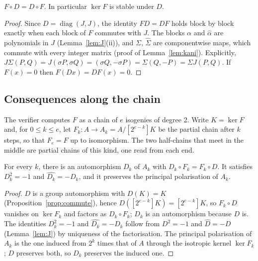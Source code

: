 \begin{proposition}
    \label{prop:commute}
    $F \circ D = D \circ F$. In particular $\ker F$ is stable under $D$.
\end{proposition}

\begin{proof}
    Since $D = \operatorname{diag}(J, J)$, the identity $FD = DF$ holds block
    by block exactly when each block of $F$ commutes with $J$. The blocks
    $\alpha$ and $\widehat{\alpha}$ are polynomials in $J$
    (Lemma~\ref{lem:J}(ii)), and $\Sigma$, $\widehat{\Sigma}$ are componentwise
    maps, which commute with every integer matrix (proof of
    Lemma~\ref{lem:kani}). Explicitly, $J\Sigma(P, Q) = J(\sigma P, \sigma Q)
    = (\sigma Q, -\sigma P) = \Sigma(Q, -P) = \Sigma J(P, Q)$. If $F(x) = 0$
    then $F(D x) = D F(x) = 0$.
\end{proof}

\subsection{Consequences along the chain}

The verifier computes $F$ as a chain of $e$ isogenies of degree 2. Write
$K = \ker F$ and, for $0 \le k \le e$, let $F_k \colon A \to A_k =
A / [2^{e-k}]K$ be the partial chain after $k$ steps, so that $F_e = F$ up
to isomorphism. The two half-chains that meet in the middle are partial
chains of this kind, one read from each end.

\begin{proposition}
    \label{prop:descent}
    For every $k$, there is an automorphism $D_k$ of $A_k$ with
    $D_k \circ F_k = F_k \circ D$. It satisfies $D_k^2 = -1$ and
    $\widehat{D_k} = -D_k$, and it preserves the principal polarisation of
    $A_k$.
\end{proposition}

\begin{proof}
    $D$ is a group automorphism with $D(K) = K$
    (Proposition~\ref{prop:commute}), hence $D([2^{e-k}]K) = [2^{e-k}]K$, so
    $F_k \circ D$ vanishes on $\ker F_k$ and factors as $D_k \circ F_k$; $D_k$
    is an automorphism because $D$ is. The identities $D_k^2 = -1$ and
    $\widehat{D_k} = -D_k$ follow from $D^2 = -1$ and $\widehat{D} = -D$
    (Lemma~\ref{lem:J}) by uniqueness of the factorisation. The principal
    polarisation of $A_k$ is the one induced from $2^k$ times that of $A$
    through the isotropic kernel $\ker F_k$; $D$ preserves both, so $D_k$
    preserves the induced one.
\end{proof}

